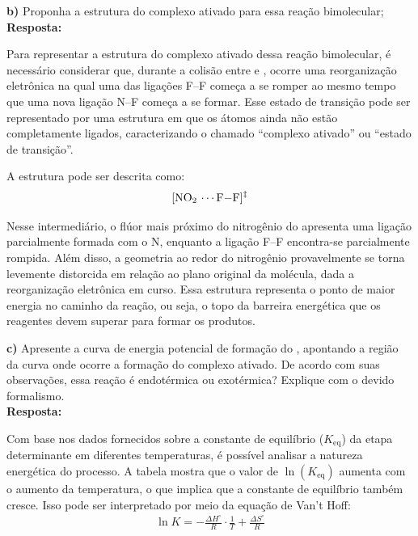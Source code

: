 \vspace{0.4cm}

\textbf{b)} Proponha a estrutura do complexo ativado para essa reação bimolecular;\\

\textbf{Resposta:} 

Para representar a estrutura do complexo ativado dessa reação bimolecular, é necessário considerar que, durante a colisão entre  e , ocorre uma reorganização eletrônica na qual uma das ligações F–F começa a se romper ao mesmo tempo que uma nova ligação N–F começa a se formar. Esse estado de transição pode ser representado por uma estrutura em que os átomos ainda não estão completamente ligados, caracterizando o chamado “complexo ativado” ou “estado de transição”.

A estrutura pode ser descrita como:
\begin{align*}
\ce{[NO2 \cdots F-F]^{\ddagger}}
\end{align*}

Nesse intermediário, o flúor mais próximo do nitrogênio do  apresenta uma ligação parcialmente formada com o N, enquanto a ligação F–F encontra-se parcialmente rompida. Além disso, a geometria ao redor do nitrogênio provavelmente se torna levemente distorcida em relação ao plano original da molécula, dada a reorganização eletrônica em curso. Essa estrutura representa o ponto de maior energia no caminho da reação, ou seja, o topo da barreira energética que os reagentes devem superar para formar os produtos.

\vspace{0.4cm}

\textbf{c)} Apresente a curva de energia potencial de formação do , apontando a região da curva onde ocorre a formação do complexo ativado. De acordo com suas observações, essa reação é endotérmica ou exotérmica? Explique com o devido formalismo.\\

\textbf{Resposta:} 

Com base nos dados fornecidos sobre a constante de equilíbrio (\(K_\text{eq}\)) da etapa determinante em diferentes temperaturas, é possível analisar a natureza energética do processo. A tabela mostra que o valor de \(\ln(K_\text{eq})\) aumenta com o aumento da temperatura, o que implica que a constante de equilíbrio também cresce. Isso pode ser interpretado por meio da equação de Van’t Hoff:
\begin{align*}
\ln K = -\frac{\Delta H^\circ}{R} \cdot \frac{1}{T} + \frac{\Delta S^\circ}{R}
\end{align*}

